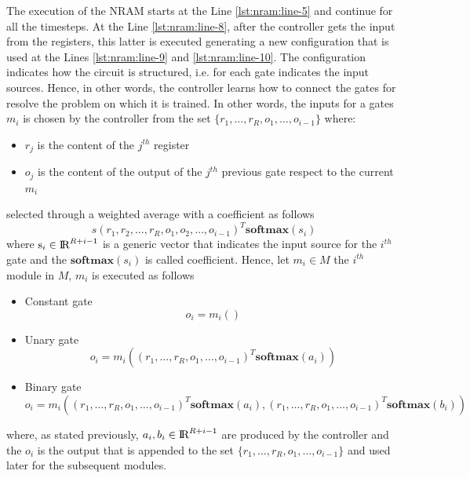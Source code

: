 The execution of the NRAM starts at the Line \ref{lst:nram:line-5} and continue for all the timesteps. At the Line \ref{lst:nram:line-8}, after the controller gets the input from the registers, this latter is executed generating a new configuration that is used at the Lines \ref{lst:nram:line-9} and \ref{lst:nram:line-10}. The configuration indicates how the circuit is structured, i.e. for each gate indicates the input sources. Hence, in other words, the controller learns how to connect the gates for resolve the problem on which it is trained. In other words, the inputs for a gates $m_i$ is chosen by the controller from the set $\{r_{1}, \dots, r_{R}, o_{1}, \dots, o_{i-1}\}$ where:
\begin{itemize}
	\item $r_j$ is the content of the $j^{th}$ register
	\item $o_j$ is the content of the output of the $j^{th}$ previous gate respect to the current $m_i$
\end{itemize}
selected through a weighted average with a coefficient as follows
\begin{equation}
s	(r_1, r_2, \dots, r_R, o_1, o_2, \dots, o_{i-1})^T\textbf{softmax}(s_i)
\end{equation}
where $\textrm{s}_i \in \textrm{I\!R}^{R+i-1}$ is a generic vector that indicates the input source for the $i^{th}$ gate and the $\textbf{softmax}(s_i)$ is called coefficient. \newline
Hence, let $m_i \in M$ the $i^{th}$ module in $M$, $m_i$ is executed as follows
\begin{itemize}
	\item{Constant gate
		\begin{equation}
			o_i = m_i()
		\end{equation}
	}
	\item{Unary gate
		\begin{equation}
			o_i = m_i((r_1, \dots, r_R, o_1, \dots, o_{i-1})^T\textbf{softmax}(a_i))
		\end{equation}
	}
	\item{Binary gate
		\begin{equation}
			o_i = m_i((r_1, \dots, r_R, o_1, \dots, o_{i-1})^T\textbf{softmax}(a_i), (r_1, \dots, r_R, o_1, \dots, o_{i-1})^T\textbf{softmax}(b_i))
		\end{equation}
	}
\end{itemize}
where, as stated previously, $a_i, b_i \in \textrm{I\!R}^{R+i-1}$ are produced by the controller and the $o_i$ is the output that is appended to the set $\{r_{1}, \dots, r_{R}, o_{1}, \dots, o_{i-1}\}$ and used later for the subsequent modules.\newline

